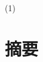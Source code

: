 (1) %
\chapter{摘要}
\renewcommand{\baselinestretch}{10} %
\par
\renewcommand{\baselinestretch}{1} %
\fontsize{12pt}\baselineskip\selectfont\qquad
\par